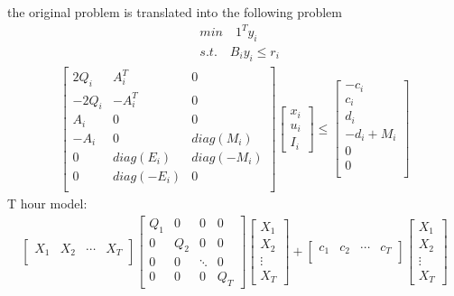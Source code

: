 \documentclass[11pt]{article} %
\begin{document}
the original problem is translated into the following problem
\begin{align}  
    &min \quad 1^T y_i \nonumber\\
    &s.t. \quad B_i y_i \leq r_i
\end{align}
\begin{align}  
    \begin{bmatrix}
         2 Q_i & A_i^T & 0\\
         -2 Q_i & -A_i^T & 0\\
         A_i & 0 & 0\\
         -A_i & 0 & diag(M_i)\\
         0 & diag(E_i) & diag(-M_i)\\
         0 & diag(-E_i) & 0\\
    \end{bmatrix}
    \begin{bmatrix}
        x_i \\
        u_i \\
        I_i 
    \end{bmatrix} \leq
    \begin{bmatrix}
        -c_{i}\\
        c_{i}\\
        d_i\\
        -d_i + M_i\\
        0\\
        0\\
    \end{bmatrix} 
\end{align}
T hour model:
\begin{align} 
    \begin{bmatrix}
        X_1 & X_2 & \cdots  & X_T\\
    \end{bmatrix} 
    \begin{bmatrix}
        Q_1 & 0 & 0 & 0\\
        0 & Q_2 & 0 & 0\\
        0 & 0 & \ddots  & 0\\
        0 & 0 & 0 & Q_T
    \end{bmatrix} 
    \begin{bmatrix}
        X_1\\
        X_2\\
        \vdots \\
        X_T
    \end{bmatrix} +
    \begin{bmatrix}
        c_1 & c_2 & \cdots  & c_T\\
    \end{bmatrix}
    \begin{bmatrix}
        X_1\\
        X_2\\
        \vdots \\
        X_T
    \end{bmatrix}
\end{align}
\end{document}
